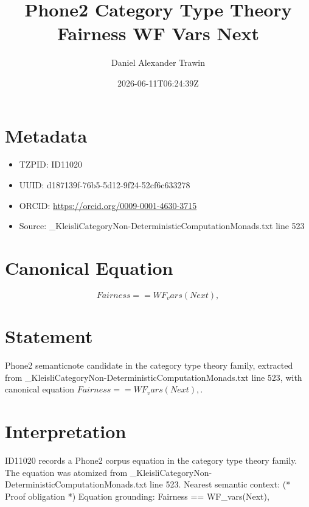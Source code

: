 \documentclass[11pt]{article}
\title{Phone2 Category Type Theory Fairness WF Vars Next}
\author{Daniel Alexander Trawin}
\date{2026-06-11T06:24:39Z}
\begin{document}
\maketitle
\section*{Metadata}
\begin{itemize}
\item TZPID: ID11020
\item UUID: d187139f-76b5-5d12-9f24-52cf6c633278
\item ORCID: \url{https://orcid.org/0009-0001-4630-3715}
\item Source: _KleisliCategoryNon-DeterministicComputationMonads.txt line 523
\end{itemize}
\section*{Canonical Equation}
\[
Fairness == WF_vars(Next),
\]
\section*{Statement}
Phone2 semanticnote candidate in the category type theory family, extracted from _KleisliCategoryNon-DeterministicComputationMonads.txt line 523, with canonical equation $Fairness == WF_vars(Next),$.
\section*{Interpretation}
ID11020 records a Phone2 corpus equation in the category type theory family. The equation was atomized from _KleisliCategoryNon-DeterministicComputationMonads.txt line 523. Nearest semantic context: (* Proof obligation *) Equation grounding: Fairness == WF_vars(Next),
\end{document}
